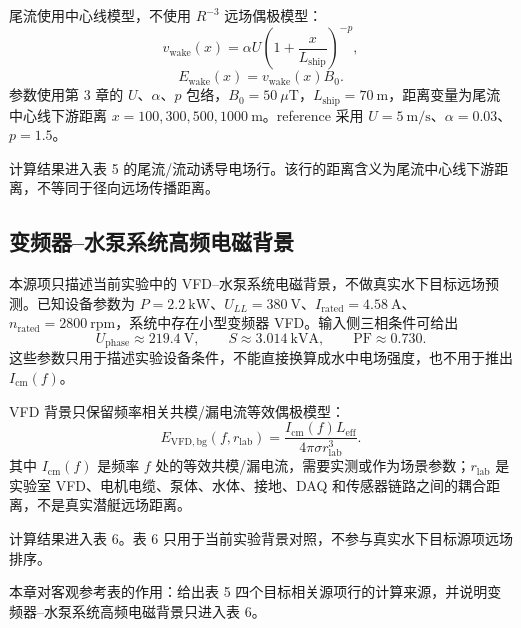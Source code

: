 尾流使用中心线模型，不使用 $R^{-3}$ 远场偶极模型：
\[
v_{\mathrm{wake}}(x)=\alpha U\left(1+\frac{x}{L_{\mathrm{ship}}}\right)^{-p},
\]
\[
E_{\mathrm{wake}}(x)=v_{\mathrm{wake}}(x)B_0.
\]
参数使用第 3 章的 $U$、$\alpha$、$p$ 包络，$B_0=50\ \mu\mathrm{T}$，$L_{\mathrm{ship}}=70\ \mathrm{m}$，距离变量为尾流中心线下游距离 $x=100,300,500,1000\ \mathrm{m}$。reference 采用 $U=5\ \mathrm{m/s}$、$\alpha=0.03$、$p=1.5$。

计算结果进入表 5 的尾流/流动诱导电场行。该行的距离含义为尾流中心线下游距离，不等同于径向远场传播距离。

\subsection{变频器--水泵系统高频电磁背景}

本源项只描述当前实验中的 VFD--水泵系统电磁背景，不做真实水下目标远场预测。已知设备参数为 $P=2.2\ \mathrm{kW}$、$U_{LL}=380\ \mathrm{V}$、$I_{\mathrm{rated}}=4.58\ \mathrm{A}$、$n_{\mathrm{rated}}=2800\ \mathrm{rpm}$，系统中存在小型变频器 VFD。输入侧三相条件可给出
\[
U_{\mathrm{phase}}\approx219.4\ \mathrm{V},\qquad
S\approx3.014\ \mathrm{kVA},\qquad
\mathrm{PF}\approx0.730.
\]
这些参数只用于描述实验设备条件，不能直接换算成水中电场强度，也不用于推出 $I_{\mathrm{cm}}(f)$。

VFD 背景只保留频率相关共模/漏电流等效偶极模型：
\[
E_{\mathrm{VFD,bg}}(f,r_{\mathrm{lab}})=
\frac{I_{\mathrm{cm}}(f)L_{\mathrm{eff}}}{4\pi\sigma r_{\mathrm{lab}}^3}.
\]
其中 $I_{\mathrm{cm}}(f)$ 是频率 $f$ 处的等效共模/漏电流，需要实测或作为场景参数；$r_{\mathrm{lab}}$ 是实验室 VFD、电机电缆、泵体、水体、接地、DAQ 和传感器链路之间的耦合距离，不是真实潜艇远场距离。

计算结果进入表 6。表 6 只用于当前实验背景对照，不参与真实水下目标源项远场排序。

本章对客观参考表的作用：给出表 5 四个目标相关源项行的计算来源，并说明变频器--水泵系统高频电磁背景只进入表 6。
